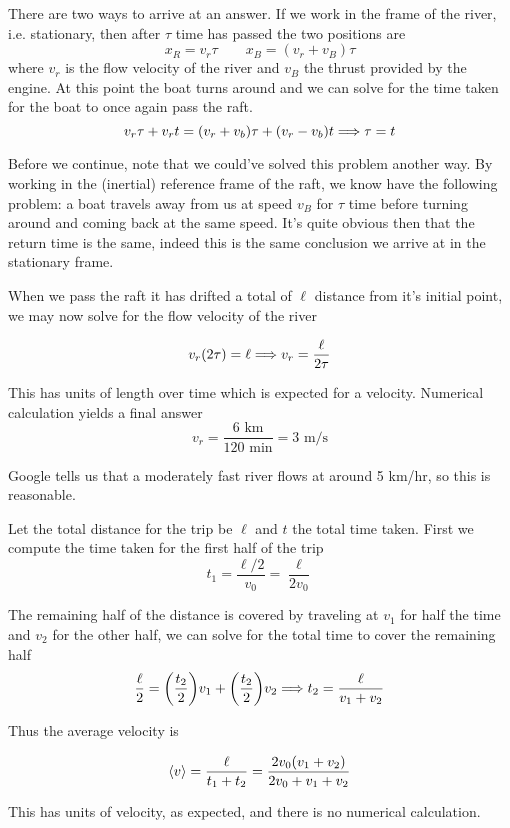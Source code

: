 \begin{exercise}
There are two ways to arrive at an answer. If we work in the frame of the river, i.e. stationary, then after $\tau$ time has passed the two positions are
\[ x_R = v_r \tau \qquad x_B = (v_r + v_B) \tau \]
where $v_r$ is the flow velocity of the river and $v_B$ the thrust provided by the engine. At this point the boat turns around and we can solve for the time taken for the boat to once again pass the raft.
\[ v_r \tau + v_r t = (v_r + v_b) \tau + (v_r - v_b) t \Longrightarrow \tau = t \]

Before we continue, note that we could've solved this problem another way. By working in the (inertial) reference frame of the raft, we know have the following problem: a boat travels away from us at speed $v_B$ for $\tau$ time before turning around and coming back at the same speed. It's quite obvious then that the return time is the same, indeed this is the same conclusion we arrive at in the stationary frame. 

When we pass the raft it has drifted a total of $\ell$ distance from it's initial point, we may now solve for the flow velocity of the river
\begin{answer}
	\[ v_r (2 \tau) = \ell \Longrightarrow v_r = \frac{\ell}{2\tau} \]
\end{answer}

This has units of length over time which is expected for a velocity. Numerical calculation yields a final answer
\[ v_r = \frac{6 \text{ km}}{120 \text{ min}} = 3 \text{ m/s}\]

Google tells us that a moderately fast river flows at around 5 km/hr, so this is reasonable.
\end{exercise}


\begin{exercise}
Let the total distance for the trip be $\ell$ and $t$ the total time taken. First we compute the time taken for the first half of the trip
\[ t_1 = \frac{\ell/2}{v_0} = \frac{\ell}{2v_0} \]

The remaining half of the distance is covered by traveling at $v_1$ for half the time and $v_2$ for the other half, we can solve for the total time to cover the remaining half
\[ \frac{\ell}{2} = \qty(\frac{t_2}{2})v_1 + \qty(\frac{t_2}{2})v_2 \Longrightarrow t_2 = \frac{\ell}{v_1 + v_2} \]

Thus the average velocity is
\begin{answer}
	\[ \left\langle v \right\rangle = \frac{\ell}{t_1 + t_2} = \frac{2v_0(v_1 + v_2)}{2v_0 + v_1 + v_2}\]
\end{answer}

This has units of velocity, as expected, and there is no numerical calculation.
\end{exercise}


